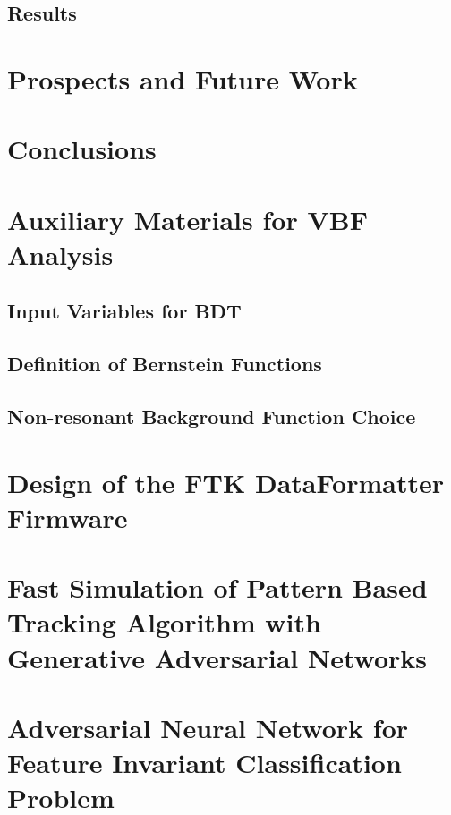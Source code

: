 \documentclass{report}
\begin{document}
\section{Results}


\chapter{Prospects and Future Work}
\chapter{Conclusions}

\appendix
\chapter{Auxiliary Materials for VBF \Hbb Analysis}
\section{Input Variables for BDT}

\section{Definition of Bernstein Functions}

\section{Non-resonant Background Function Choice}


\chapter{Design of the FTK DataFormatter Firmware}
\chapter{Fast Simulation of Pattern Based Tracking Algorithm with Generative Adversarial Networks}
\chapter{Adversarial Neural Network for Feature Invariant Classification Problem}



\end{document}
